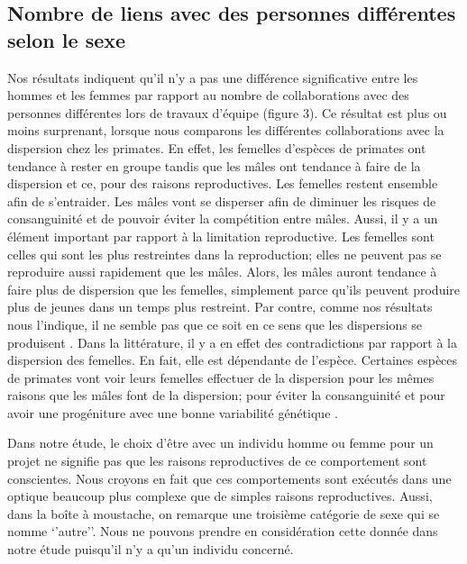 \documentclass[twoside,twocolumn]{article}
\begin{document}
\subsection{Nombre de liens avec des personnes différentes selon le sexe}
Nos résultats indiquent qu’il n’y a pas une différence significative entre les hommes et les femmes par rapport au nombre de collaborations avec des personnes différentes lors de travaux d’équipe (figure 3). Ce résultat est plus ou moins surprenant, lorsque nous comparons les différentes collaborations avec la dispersion chez les primates. En effet, les femelles d’espèces de primates ont tendance à rester en groupe tandis que les mâles ont tendance à faire de la dispersion et ce, pour des raisons reproductives. Les femelles restent ensemble afin de s’entraider. Les mâles vont se disperser afin de diminuer les risques de consanguinité et de pouvoir éviter la compétition entre mâles. Aussi, il y a un élément important par rapport à la limitation reproductive. Les femelles sont celles qui sont les plus restreintes dans la reproduction; elles ne peuvent pas se reproduire aussi rapidement que les mâles. Alors, les mâles auront tendance à faire plus de dispersion que les femelles, simplement parce qu’ils peuvent produire plus de jeunes dans un temps plus restreint. Par contre, comme nos résultats nous l’indique, il ne semble pas que ce soit en ce sens que les dispersions se produisent \citep{diaz2014no}. Dans la littérature, il y a en effet des contradictions par rapport à la dispersion des femelles. En fait, elle est dépendante de l’espèce. Certaines espèces de primates vont voir leurs femelles effectuer de la dispersion pour les mêmes raisons que les mâles font de la dispersion; pour éviter la consanguinité et pour avoir une progéniture avec une bonne variabilité génétique \citep{jack2009female}.

Dans notre étude, le choix d’être avec un individu homme ou femme pour un projet ne signifie pas que les raisons reproductives de ce comportement sont conscientes. Nous croyons en fait que ces comportements sont exécutés dans une optique beaucoup plus complexe que de simples raisons reproductives. Aussi, dans la boîte à moustache, on remarque une troisième catégorie de sexe qui se nomme ‘’autre’’. Nous ne pouvons prendre en considération cette donnée dans notre étude puisqu’il n’y a qu’un individu concerné.
\end{document}
